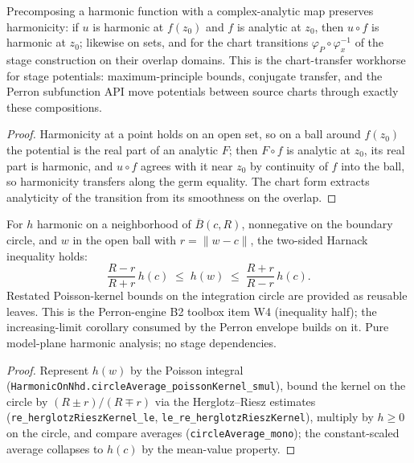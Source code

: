\begin{lemma}
\label{lem:stage-harmonic-analytic-compose}
Precomposing a harmonic function with a complex-analytic map preserves
harmonicity: if \(u\) is harmonic at \(f(z_0)\) and \(f\) is analytic at
\(z_0\), then \(u \circ f\) is harmonic at \(z_0\); likewise on sets, and
for the chart transitions
\(\varphi_P \circ \varphi_x^{-1}\) of the stage construction on their
overlap domains.  This is the chart-transfer workhorse for stage
potentials: maximum-principle bounds, conjugate transfer, and the Perron
subfunction API move potentials between source charts through exactly
these compositions.
\leanok
\end{lemma}
\begin{proof}\leanok
Harmonicity at a point holds on an open set, so on a ball around
\(f(z_0)\) the potential is the real part of an analytic \(F\); then
\(F \circ f\) is analytic at \(z_0\), its real part is harmonic, and
\(u \circ f\) agrees with it near \(z_0\) by continuity of \(f\) into the
ball, so harmonicity transfers along the germ equality.  The chart form
extracts analyticity of the transition from its smoothness on the
overlap.
\end{proof}

\begin{lemma}
\label{lem:perron-harnack-disc}
For \(h\) harmonic on a neighborhood of \(\overline{B}(c, R)\),
nonnegative on the boundary circle, and \(w\) in the open ball with
\(r = \lVert w - c\rVert\), the two-sided Harnack inequality holds:
\[
  \frac{R - r}{R + r}\, h(c) \;\le\; h(w) \;\le\; \frac{R + r}{R - r}\, h(c).
\]
Restated Poisson-kernel bounds on the integration circle are provided as
reusable leaves.  This is the Perron-engine B2 toolbox item W4
(inequality half); the increasing-limit corollary consumed by the Perron
envelope builds on it.  Pure model-plane harmonic analysis; no stage
dependencies.
\leanok
\end{lemma}
\begin{proof}\leanok
Represent \(h(w)\) by the Poisson integral
(\texttt{HarmonicOnNhd.circleAverage\_poissonKernel\_smul}), bound the
kernel on the circle by \((R \pm r)/(R \mp r)\) via the Herglotz--Riesz
estimates (\texttt{re\_herglotzRieszKernel\_le},
\texttt{le\_re\_herglotzRieszKernel}), multiply by \(h \ge 0\) on the
circle, and compare averages (\texttt{circleAverage\_mono}); the
constant-scaled average collapses to \(h(c)\) by the mean-value property.
\end{proof}

